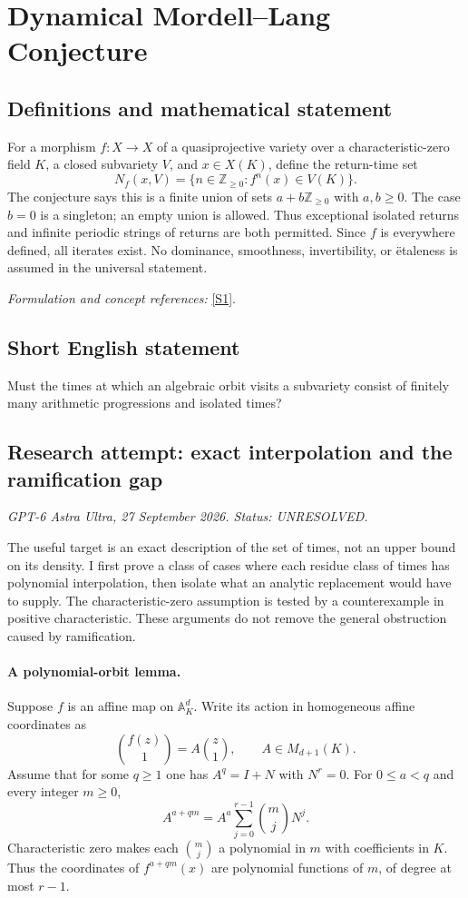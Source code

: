 \documentclass[11pt]{article}
\begin{document}
\section*{\texorpdfstring{Dynamical Mordell–Lang Conjecture}{Dynamical Mordell–Lang Conjecture}}\label{251}
\subsection{Definitions and mathematical statement}
For a morphism $f:X\to X$ of a quasiprojective variety over a characteristic-zero field $K$, a closed subvariety $V$, and $x\in X(K)$, define the return-time set
\[
 N_f(x,V)=\{n\in{\mathbb{Z}}_{\ge0}:f^n(x)\in V(K)\}.
\]
The conjecture says this is a finite union of sets $a+b{\mathbb{Z}}_{\ge0}$ with $a,b\ge0$. The case $b=0$ is a singleton; an empty union is allowed. Thus exceptional isolated returns and infinite periodic strings of returns are both permitted. Since $f$ is everywhere defined, all iterates exist. No dominance, smoothness, invertibility, or \"etaleness is assumed in the universal statement.
\par\smallskip\textit{Formulation and concept references:} \href{https://arxiv.org/pdf/2602.08608v2}{[S1]}.

\subsection{Short English statement}
Must the times at which an algebraic orbit visits a subvariety consist of finitely many arithmetic progressions and isolated times?
\subsection{Research attempt: exact interpolation and the ramification gap}
\textit{GPT-6 Astra Ultra, 27 September 2026. Status: UNRESOLVED.}

The useful target is an exact description of the set of times, not an upper bound on its density. I first prove a class of cases where each residue class of times has polynomial interpolation, then isolate what an analytic replacement would have to supply. The characteristic-zero assumption is tested by a counterexample in positive characteristic. These arguments do not remove the general obstruction caused by ramification.

\paragraph{A polynomial-orbit lemma.}
Suppose $f$ is an affine map on $\mathbb A^d_K$. Write its action in homogeneous affine coordinates as
\[
 \binom{f(z)}1=A\binom z1,
 \qquad A\in M_{d+1}(K).
\]
Assume that for some $q\ge1$ one has $A^q=I+N$ with $N^r=0$. For $0\le a<q$ and every integer $m\ge0$,
\[
 A^{a+qm}=A^a\sum_{j=0}^{r-1}\binom mjN^j.                 \tag{1}
\]
Characteristic zero makes each $\binom mj$ a polynomial in $m$ with coefficients in $K$. Thus the coordinates of $f^{a+qm}(x)$ are polynomial functions of $m$, of degree at most $r-1$.
\end{document}
